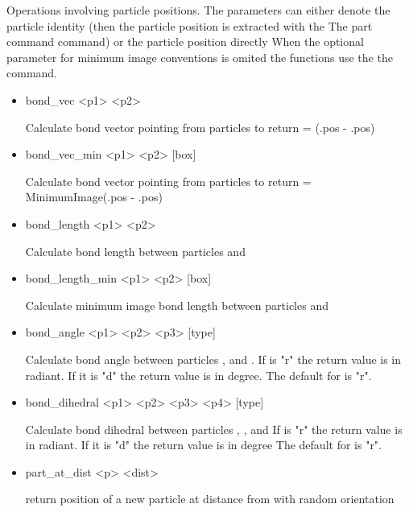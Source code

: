 \begin{itemize}
  Operations involving particle positions. The parameters  can
  either denote the particle identity (then the particle position is
  extracted with the The part command command) or the particle
  position directly When the optional  parameter for minimum
  image conventions is omited the functions use the the  command.
  \begin{itemize}
   \item
\begin{code}
bond\_vec <p1> <p2>
\end{code}
    Calculate bond vector pointing from particles  to 
    return = (.pos - .pos)
   \item
\begin{code}
bond\_vec\_min <p1> <p2> [box]
\end{code}
    Calculate bond vector pointing from particles  to 
    return = MinimumImage(.pos - .pos)
   \item
\begin{code}
bond\_length <p1> <p2>
\end{code}
    Calculate bond length between particles  and 
   \item
\begin{code}
bond\_length\_min <p1> <p2> [box]
\end{code}
    Calculate minimum image bond length between particles  and 
   \item
\begin{code}
bond\_angle <p1> <p2> <p3> [type]
\end{code}
Calculate bond angle between particles ,  and
. If  is "r" the return value is in radiant. If it
is "d" the return value is in degree. The default for  is
"r".
   \item
\begin{code}
bond\_dihedral <p1> <p2> <p3> <p4> [type]
\end{code}
Calculate bond dihedral between particles , , 
and  If  is "r" the return value is in radiant. If
it is "d" the return value is in degree The default for  is
"r".
   \item
\begin{code}
part\_at\_dist <p> <dist>
\end{code}
return position of a new particle at distance  from 
with random orientation

\end{itemize}
\end{itemize}
